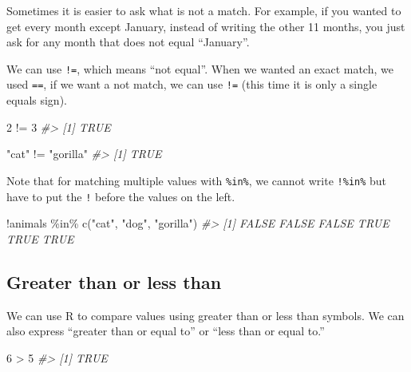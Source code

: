 \documentclass[
]{krantz}
\makeatletter
\newenvironment{Shaded}{\begin{snugshade}}{\end{snugshade}}
\newcommand{\CommentTok}[1]{\textcolor[rgb]{0.37,0.37,0.37}{\textit{#1}}}
\newcommand{\DecValTok}[1]{\textcolor[rgb]{0.06,0.06,0.06}{#1}}
\newcommand{\FunctionTok}[1]{\textcolor[rgb]{0,0,0}{#1}}
\newcommand{\NormalTok}[1]{#1}
\newcommand{\SpecialCharTok}[1]{\textcolor[rgb]{0,0,0}{#1}}
\newcommand{\StringTok}[1]{\textcolor[rgb]{0.5,0.5,0.5}{#1}}
\newenvironment{kframe}{%
\medskip{}
\setlength{\fboxsep}{.8em}
 \def\at@end@of@kframe{}%
 \ifinner\ifhmode%
  \def\at@end@of@kframe{\end{minipage}}%
  \begin{minipage}{\columnwidth}%
 \fi\fi%
 \def\FrameCommand##1{\hskip\@totalleftmargin \hskip-\fboxsep
 \colorbox{shadecolor}{##1}\hskip-\fboxsep
     \hskip-\linewidth \hskip-\@totalleftmargin \hskip\columnwidth}%
 \MakeFramed {\advance\hsize-\width
   \@totalleftmargin\z@ \linewidth\hsize
   \@setminipage}}%
 {\par\unskip\endMakeFramed%
 \at@end@of@kframe}
\renewenvironment{Shaded}{\begin{kframe}}{\end{kframe}}
\makeatother
\begin{document}
Sometimes it is easier to ask what is not a match. For example, if you wanted to get every month except January, instead of writing the other 11 months, you just ask for any month that does not equal ``January''.

We can use \texttt{!=}, which means ``not equal''. When we wanted an exact match, we used \texttt{==}, if we want a not match, we can use \texttt{!=} (this time it is only a single equals sign).

\begin{Shaded}
\begin{Highlighting}[]
\DecValTok{2} \SpecialCharTok{!=} \DecValTok{3}
\CommentTok{\#\textgreater{} [1] TRUE}
\end{Highlighting}
\end{Shaded}

\begin{Shaded}
\begin{Highlighting}[]
\StringTok{"cat"} \SpecialCharTok{!=} \StringTok{"gorilla"}
\CommentTok{\#\textgreater{} [1] TRUE}
\end{Highlighting}
\end{Shaded}

Note that for matching multiple values with \texttt{\%in\%}, we cannot write \texttt{!\%in\%} but have to put the \texttt{!} before the values on the left.

\begin{Shaded}
\begin{Highlighting}[]
\SpecialCharTok{!}\NormalTok{animals }\SpecialCharTok{\%in\%} \FunctionTok{c}\NormalTok{(}\StringTok{"cat"}\NormalTok{, }\StringTok{"dog"}\NormalTok{, }\StringTok{"gorilla"}\NormalTok{)}
\CommentTok{\#\textgreater{} [1] FALSE FALSE FALSE  TRUE  TRUE  TRUE}
\end{Highlighting}
\end{Shaded}

\hypertarget{greater-than-or-less-than}{%
\subsection{Greater than or less than}\label{greater-than-or-less-than}}

We can use R to compare values using greater than or less than symbols. We can also express ``greater than or equal to'' or ``less than or equal to.''

\begin{Shaded}
\begin{Highlighting}[]
\DecValTok{6} \SpecialCharTok{\textgreater{}} \DecValTok{5}
\CommentTok{\#\textgreater{} [1] TRUE}
\end{Highlighting}
\end{Shaded}
\end{document}
